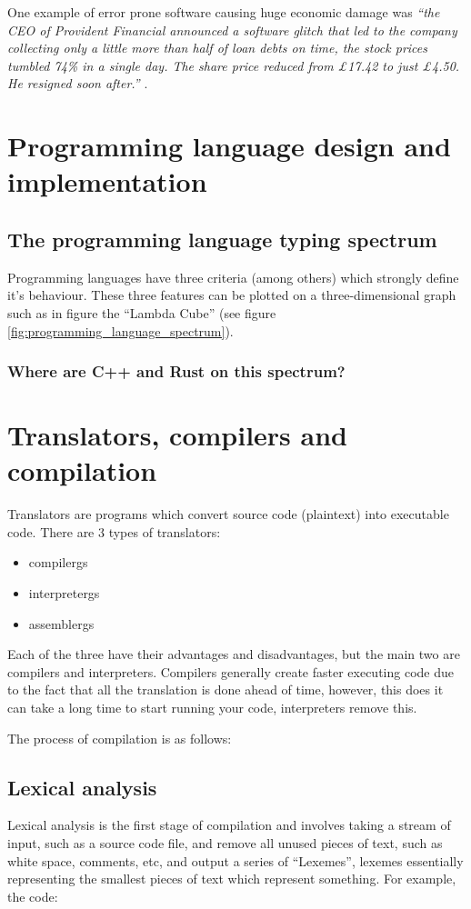 \documentclass{article}
\begin{document}
One example of error prone software causing huge economic damage was \emph{``the CEO of Provident Financial announced a software glitch that led to the company collecting only a little more than half of loan debts on time, the stock prices tumbled 74\% in a single day. The share price reduced from £17.42 to just £4.50. He resigned soon after.''} \parencite{cost_of_bugs}.
\section{Programming language design and implementation}
\subsection{The programming language typing spectrum}
Programming languages have three criteria (among others) which strongly define it's behaviour. These three features can be plotted on a three-dimensional graph such as in figure the ``Lambda Cube'' (see figure \ref{fig:programming_language_spectrum}).
\subsubsection{Where are C++ and Rust on this spectrum?}

\section{Translators, compilers and compilation}
Translators are programs which convert source code (plaintext) into executable code.
There are 3 types of translators:
\begin{itemize}
	\item \Glspl{compilerg}
	\item \Glspl{interpreterg}
	\item \Glspl{assemblerg}
\end{itemize}

Each of the three have their advantages and disadvantages, but the main two are compilers and interpreters. Compilers generally create faster executing code due to the fact that all the translation is done ahead of time, however, this does it can take a long time to start running your code, interpreters remove this.

The process of compilation is as follows:
\subsection{Lexical analysis}
Lexical analysis is the first stage of compilation and involves taking a stream of input, such as a source code file, and remove all unused pieces of text, such as white space, comments, etc, and output a series of ``Lexemes'', lexemes essentially representing the smallest pieces of text which represent something. For example, the code:
\end{document}
